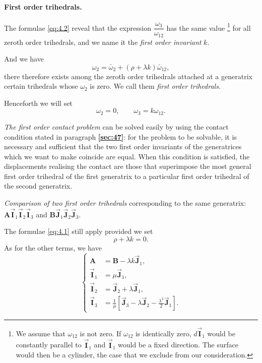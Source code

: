 \documentclass[leqno,11pt]{book}
\numberwithin{equation}{chapter}
\theoremstyle{shape1}
\theoremstyle{shapesmall}
\newcommand{\fsref}[1]{{\rm\textsection\textbf{\ref{sec:#1}}}}
\newcommand{\rvec}[1]{\vec{\mathbf{#1}}}
\newcommand{\ivec}{\rvec{I}}
\newcommand{\jvec}{\rvec{J}}
\begin{document}
\paragraph{First order trihedrals.}
\label{sec:50}
The formulae \eqref{eq:4.2} reveal that the expression $\dfrac{\omega_{3}}{\omega_{12}}$ has the same value \footnote{We assume that $\omega_{12}$ is not zero. If $\omega_{12}$ is identically zero, $d\ivec_{1}$ would be constantly parallel to $\ivec_{1}$ and $\ivec_{1}$ would be a fixed direction. The surface would then be a cylinder, the case that we exclude from our consideration.} for all zeroth order trihedrals, and we name it the \emph{first order invariant} $k$.

And we have
\[
\omega_{2}=\bar\omega_{2}+(\rho+\lambda k)\bar\omega_{12},
\]
there therefore exists among the zeroth order trihedrals attached at a generatrix certain trihedrals whose $\omega_{2}$ is zero. We call them \emph{first order trihedrals}.

Henceforth we will set
\begin{equation}
  \label{eq:4.3}
  \omega_{2}=0,\qquad\omega_{3}=k\omega_{12}.
\end{equation}

\emph{The first order contact problem} can be solved easily by using the contact condition stated in paragraph \fsref{47}: for the problem to be solvable, it is necessary and sufficient that the two first order invariants of the generatrices which we want to make coincide are equal. When this condition is satisfied, the displacements realising the contact are those that superimpose the most general first order trihedral of the first generatrix to a particular first order trihedral of the second generatrix.

\emph{Comparison of two first order trihedrals} corresponding to the same generatrix: $\mathbf{A}\ivec_{1}\ivec_{2}\ivec_{3}$ and $\mathbf{B}\jvec_{1}\jvec_{2}\jvec_{3}$.

The formulae \eqref{eq:4.1} still apply provided we set
\[
\rho+\lambda k=0.
\]
As for the other terms, we have
\begin{equation}
  \label{eq:4.4}
  \left\{
    \begin{aligned}
      \mathbf{A}&=\mathbf{B}-\lambda k\jvec_{1},\\
      \ivec_{1}&=\mu\jvec_{1},\\
      \ivec_{2}&=\jvec_{2}+\lambda\jvec_{1},\\
      \ivec_{3}&=\frac{1}{\mu}\left[\jvec_{3}-\lambda\jvec_{2}-\frac{\lambda^{2}}{2}\jvec_{1}\right].
    \end{aligned}
  \right.
\end{equation}
\end{document}
